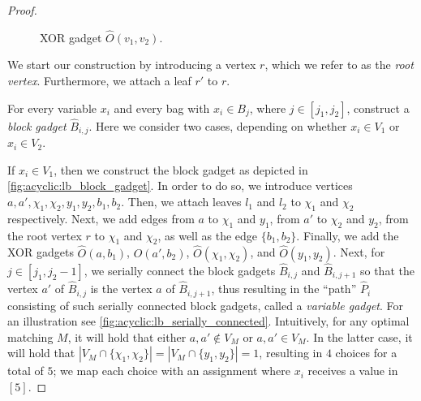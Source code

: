 \begin{proof}
\begin{figure}[htb]
        \caption{XOR gadget $\hat{O}(v_1,v_2)$.}
        \label{fig:acyclic:lb_or_gadget}
    \end{figure}


    We start our construction by introducing a vertex $r$, which we refer to as the \emph{root vertex}.
    Furthermore, we attach a leaf $r'$ to $r$.



    For every variable $x_i$ and every bag with $x_i \in B_j$, where $j \in [j_1,j_2]$,
    construct a \emph{block gadget} $\hat{B}_{i,j}$.
    Here we consider two cases, depending on whether $x_i \in V_1$ or $x_i \in V_2$.

    If $x_i \in V_1$, then we construct the block gadget as depicted in \cref{fig:acyclic:lb_block_gadget}.
    In order to do so, we introduce vertices $a, a', \chi_1, \chi_2, y_1, y_2, b_1, b_2$.
    Then, we attach leaves $l_1$ and $l_2$ to $\chi_1$ and $\chi_2$ respectively.
    Next, we add edges from $a$ to $\chi_1$ and $y_1$, from $a'$ to $\chi_2$ and $y_2$,
    from the root vertex $r$ to $\chi_1$ and $\chi_2$, as well as the edge $\{b_1,b_2\}$.
    Finally, we add the XOR gadgets $\hat{O}(a,b_1)$, $\hat{O}(a',b_2)$, $\hat{O}(\chi_1,\chi_2)$,
    and $\hat{O}(y_1,y_2)$.
    Next, for $j \in [j_1,j_2-1]$, we serially connect the block gadgets $\hat{B}_{i,j}$ and $\hat{B}_{i,j+1}$ so that the vertex $a'$ of $\hat{B}_{i,j}$ is the vertex $a$ of $\hat{B}_{i,j+1}$,
    thus resulting in the ``path'' $\hat{P}_i$ consisting of such serially connected block gadgets, called a \emph{variable gadget}.
    For an illustration see \cref{fig:acyclic:lb_serially_connected}.
    Intuitively, for any optimal matching $M$,
    it will hold that either $a, a' \notin V_M$ or $a, a' \in V_M$.
    In the latter case, it will hold that $|V_M \cap \{\chi_1,\chi_2\}| = |V_M \cap \{y_1,y_2\}| = 1$,
    resulting in $4$ choices for a total of $5$;
    we map each choice with an assignment where $x_i$ receives a value in $[5]$.



\end{proof}
